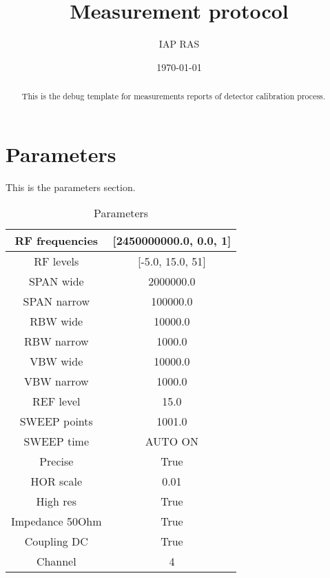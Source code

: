 \documentclass
[12pt,a4paper]
{article}
\title{Measurement protocol}
\author{IAP RAS}
\date{\today}
\begin{document}
\maketitle

\begin{abstract}
This is the debug template for measurements reports of detector calibration process.
\end{abstract}

\section{Parameters}
This is the parameters section.

\begin{table}[htbp]
\centering
\begin{tabular}{|c|c|}
\hline
RF frequencies & [2450000000.0, 0.0, 1] \\
\hline
RF levels & [-5.0, 15.0, 51] \\
\hline
SPAN wide & 2000000.0 \\
\hline
SPAN narrow & 100000.0 \\
\hline
RBW wide & 10000.0 \\
\hline
RBW narrow & 1000.0 \\
\hline
VBW wide & 10000.0 \\
\hline
VBW narrow & 1000.0 \\
\hline
REF level & 15.0 \\
\hline
SWEEP points & 1001.0 \\
\hline
SWEEP time & AUTO ON \\
\hline
Precise & True \\
\hline
HOR scale & 0.01 \\
\hline
High res & True \\
\hline
Impedance 50Ohm & True \\
\hline
Coupling DC & True \\
\hline
Channel & 4 \\
\hline
\end{tabular}
\caption{Parameters}
\label{params}
\end{table}
\end{document}
